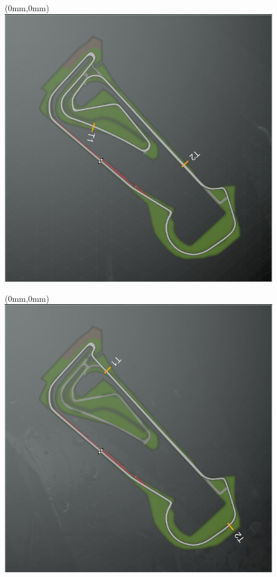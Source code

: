 \null\newpage
\begin{textblock*}{30mm}(0mm,0mm)%
\includegraphics[width=120mm]{TR/2015-05-20_00060.png}
\end{textblock*}
\null\newpage
\begin{textblock*}{30mm}(0mm,0mm)%
\includegraphics[width=120mm]{TR/2015-05-20_00061.png}
\end{textblock*}
